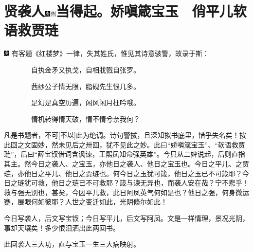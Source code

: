 

\chapter[贤袭人娇嗔箴宝玉\hspace{.5em}　俏平儿软语救贾琏]{\texorpdfstring{贤袭人{\protect\includegraphics[width=3mm]{../Images/00004}\protect\includegraphics[width=3mm]{../Images/00011}\footnotesize \kaishu 当得起。}娇嗔箴宝玉　俏平儿软语救贾琏}{贤袭人庚辰本侧批当得起。娇嗔箴宝玉　俏平儿软语救贾琏}}
{\includegraphics[width=3mm]{../Images/00004}  \kaishu 有客题《红楼梦》一律，失其姓氏，惟见其诗意骇警，故录于斯：}

{　　　　自执金矛又执戈，自相戕戮自张罗。}

{　　　　茜纱公子情无限，脂砚先生恨几多。}

{　　　　是幻是真空历遍，闲风闲月枉吟哦。}

{　　　　情机转得情天破，情不情兮奈我何？}

{凡是书题者，不可{[}不以{]}此为绝调。诗句警拔，且深知拟书底里，惜乎失名矣！按此回之文固妙，然未见后之卅回，犹不见此之妙。此曰``娇嗔箴宝玉''、``软语救贾琏''，后曰``薛宝钗借词含讽谏，王熙凤知命强英雄''。今只从二婢说起，后则直指其主。然今日之袭人、之宝玉，亦他日之袭人、他日之宝玉也。今日之平儿、之贾琏，亦他日之平儿、他日之贾琏也。何今日之玉犹可箴，他日之玉已不可箴耶？今日之琏犹可救，他日之琏已不可救耶？箴与谏无异也，而袭人安在哉？宁不悲乎！救与强无别也，甚矣，今因平儿救，此日阿凤英气何如是也？他日之强，何身微运蹇，展眼何如彼耶？人世之变迁如此，光阴倏尔如此！}

{今日写袭人，后文写宝钗；今日写平儿，后文写阿凤。文是一样情理，景况光阴，事却天壤矣！多少恨泪洒出此两回书。}

{此回袭人三大功，直与宝玉一生三大病映射。}

